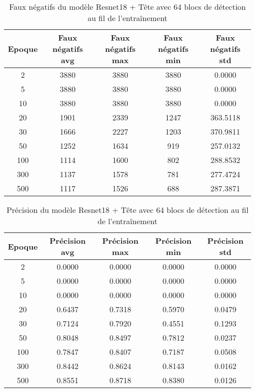 \begin{table}[!ht]
    \caption{Faux négatifs du modèle Resnet18 + Tête avec 64 blocs de détection au fil de l'entraînement}
    \label{tab:resnet18+head_64n_false_negative}
    \centering
    \begin{tabular}{ |c||c|c|c|c|  }
        \hline
        \rowcolor{gray!50}
        Epoque & Faux négatifs avg & Faux négatifs max & Faux négatifs min & Faux négatifs std\\
        \hline
        2 & 3880 & 3880 & 3880 & 0.0000\\
        5 & 3880 & 3880 & 3880 & 0.0000\\
        10 & 3880 & 3880 & 3880 & 0.0000\\
        20 & 1901 & 2339 & 1247 & 363.5118\\
        30 & 1666 & 2227 & 1203 & 370.9811\\
        50 & 1252 & 1634 & 919 & 257.0132\\
        100 & 1114 & 1600 & 802 & 288.8532\\
        300 & 1137 & 1578 & 781 & 277.4724\\
        500 & 1117 & 1526 & 688 & 287.3871\\
        \hline
    \end{tabular}
\end{table}

\begin{table}[!ht]
    \caption{Précision du modèle Resnet18 + Tête avec 64 blocs de détection au fil de l'entraînement}
    \label{tab:resnet18+head_64n_precision}
    \centering
    \begin{tabular}{ |c||c|c|c|c|  }
        \hline
        \rowcolor{gray!50}
        Epoque & Précision avg & Précision max & Précision min & Précision std\\
        \hline
        2 & 0.0000 & 0.0000 & 0.0000 & 0.0000\\
        5 & 0.0000 & 0.0000 & 0.0000 & 0.0000\\
        10 & 0.0000 & 0.0000 & 0.0000 & 0.0000\\
        20 & 0.6437 & 0.7318 & 0.5970 & 0.0479\\
        30 & 0.7124 & 0.7920 & 0.4551 & 0.1293\\
        50 & 0.8048 & 0.8497 & 0.7812 & 0.0237\\
        100 & 0.7847 & 0.8407 & 0.7187 & 0.0508\\
        300 & 0.8442 & 0.8624 & 0.8143 & 0.0162\\
        500 & 0.8551 & 0.8718 & 0.8380 & 0.0126\\
        \hline
    \end{tabular}
\end{table}

